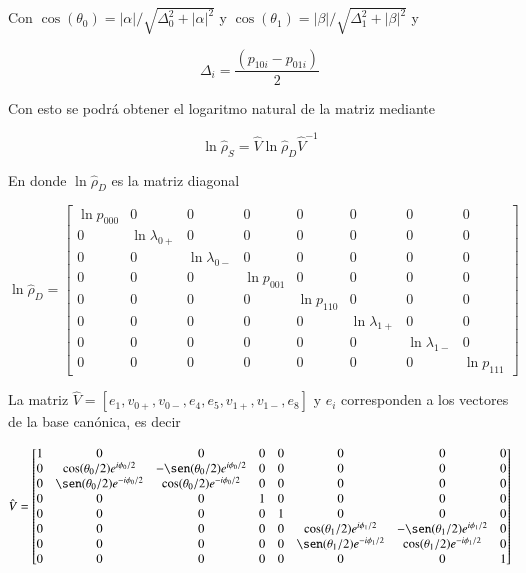 \begin{appendixs}
Con $\cos(\theta_{0}) = |\alpha|/\sqrt{\Delta^{2}_{0} + |\alpha|^{2}}$ y $\cos(\theta_{1}) = |\beta|/\sqrt{\Delta^{2}_{1} + |\beta|^{2}}$ y

\begin{equation*}
    \Delta_{i} = \frac{(p_{10i} - p_{01i})}{2}
\end{equation*}

Con esto se podrá obtener el logaritmo natural de la matriz mediante

\begin{equation*}
    \ln \hat{\rho}_{S} = \hat{V}\ln \hat{\rho}_{D} \hat{V}^{-1}
\end{equation*}
    
En donde $\ln \hat{\rho}_{D}$ es la matriz diagonal 

\begin{equation*}
    \ln \hat{\rho}_{D} = 
    \begin{bmatrix}
        \ln p_{000} & 0 & 0 & 0 & 0 & 0 & 0 & 0 \\
        0 & \ln \lambda_{0+} & 0 & 0 & 0 & 0 & 0 & 0 \\
        0 & 0 & \ln \lambda_{0-} & 0 & 0 & 0 & 0 & 0 \\
        0 & 0 & 0 & \ln p_{001} & 0 & 0 & 0 & 0 \\
        0 & 0 & 0 & 0 & \ln p_{110} & 0 & 0 & 0 \\
        0 & 0 & 0 & 0 & 0 & \ln \lambda_{1+} & 0 & 0 \\
        0 & 0 & 0 & 0 & 0 & 0 & \ln \lambda_{1-} & 0 \\
        0 & 0 & 0 & 0 & 0 & 0 & 0 & \ln p_{111} 
        \end{bmatrix}
\end{equation*}

La matriz $\hat{V} = [e_{1},v_{0+},v_{0-},e_{4},e_{5},v_{1+},v_{1-},e_{8}]$ y $e_{i}$ corresponden a los vectores de la base canónica, es decir 

\begin{equation*}
    \hat{V} = 
    \begin{bmatrix}
        1 & 0 & 0 & 0 & 0 & 0 & 0 & 0 \\
        0 & \cos(\theta_{0}/2)e^{i\phi_{0}/2} & -\sen(\theta_{0}/2)e^{i\phi_{0}/2} & 0 & 0 & 0 & 0 & 0 \\
        0 & \sen(\theta_{0}/2)e^{-i\phi_{0}/2} & \cos(\theta_{0}/2)e^{-i\phi_{0}/2} & 0 & 0 & 0 & 0 & 0 \\
        0 & 0 & 0 & 1 & 0 & 0 & 0 & 0 \\
        0 & 0 & 0 & 0 & 1 & 0 & 0 & 0 \\
        0 & 0 & 0 & 0 & 0 &  \cos(\theta_{1}/2)e^{i\phi_{1}/2} & -\sen(\theta_{1}/2)e^{i\phi_{1}/2} & 0 \\
        0 & 0 & 0 & 0 & 0 & \sen(\theta_{1}/2)e^{-i\phi_{1}/2} & \cos(\theta_{1}/2)e^{-i\phi_{1}/2} & 0 \\
        0 & 0 & 0 & 0 & 0 & 0 & 0 & 1 
        \end{bmatrix}
\end{equation*}


\end{appendixs}

